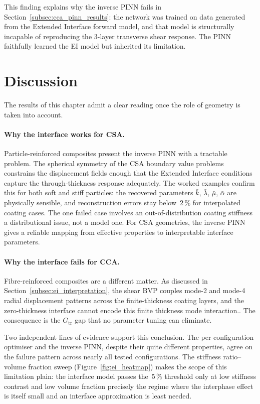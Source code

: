 \documentclass[oneside, 12pt, a4paper, bibliography=totoc]{book}
\begin{document}
This finding explains why the inverse PINN fails in Section~\ref{subsec:cca_pinn_results}: the network was trained on data generated from the Extended Interface forward model, and that model is structurally incapable of reproducing the 3-layer transverse shear response. The PINN faithfully learned the EI model but inherited its limitation.

\section{Discussion}
\label{sec:results_discussion}

The results of this chapter admit a clear reading once the role of geometry is taken into account.

\paragraph{Why the interface works for CSA.}
Particle-reinforced composites present the inverse PINN with a tractable problem. The spherical symmetry of the CSA boundary value problems constrains the displacement fields enough that the Extended Interface conditions capture the through-thickness response adequately. The worked examples confirm this for both soft and stiff particles: the recovered parameters $\bar{k}$, $\bar{\lambda}$, $\bar{\mu}$, $\bar{\alpha}$ are physically sensible, and reconstruction errors stay below~$2\,\%$ for interpolated coating cases. The one failed case involves an out-of-distribution coating stiffness a distributional issue, not a model one. For CSA geometries, the inverse PINN gives a reliable mapping from effective properties to interpretable interface parameters.

\paragraph{Why the interface fails for CCA.}
Fibre-reinforced composites are a different matter. As discussed in Section~\ref{subsec:ei_interpretation}, the shear BVP couples mode-2 and mode-4 radial displacement patterns across the finite-thickness coating layers, and the zero-thickness interface cannot encode this finite thickness mode interaction.. The consequence is the  $G_{\text{tr}}$ gap that no parameter tuning can eliminate.

Two independent lines of evidence support this conclusion. The per-configuration optimiser and the inverse PINN, despite their quite different properties, agree on the failure pattern across nearly all tested configurations. The stiffness ratio--volume fraction sweep (Figure~\ref{fig:ei_heatmap}) makes the scope of this limitation plain: the interface model passes the~$5\,\%$ threshold only at low stiffness contrast and low volume fraction precisely the regime where the interphase effect is itself small and an interface approximation is least needed.
\end{document}
